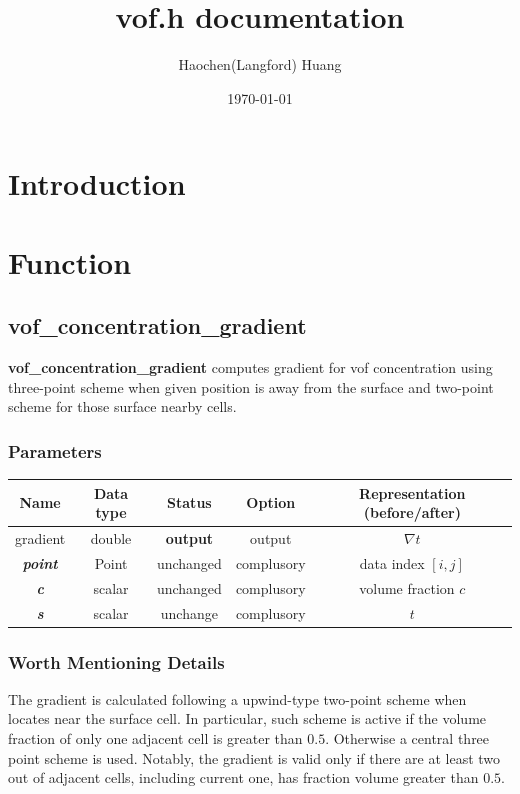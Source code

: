 \documentclass[a4paper]{article}
\title{vof.h documentation}
\author{Haochen(Langford) Huang}
\date{\today}
\newcommand{\func}[1]{\textbf{\textcolor{function}{#1}}}
\newcommand{\para}[1]{\textbf{\emph{\textcolor{para}{#1}}}}
\begin{document}
\maketitle
\section{Introduction}
\section{Function}
\subsection{\func{vof\_concentration\_gradient}}
\func{vof\_concentration\_gradient} computes gradient for vof concentration using three-point scheme when given position is away from the surface and two-point scheme for those surface nearby cells.
\subsubsection{Parameters}
\begin{table}[h]
  \centering
  \begin{tabular}{|c|c|c|c|c|}
    \hline
    Name & Data type & Status & Option & Representation (before/after)\\[0.5ex]
    \hline\hline
    \rowcolor{output} gradient & double & \textbf{output} & output & $\nabla t$\\
    \hline
    \para{point} & Point & unchanged & complusory & data index $[i,j]$\\
    \hline
    \para{c} & scalar & unchanged & complusory & volume fraction $c$\\
    \hline
    \para{s} & scalar & unchange & complusory & $t$\\
    \hline
  \end{tabular}
\end{table}
\subsubsection{Worth Mentioning Details}
The gradient is calculated following a upwind-type two-point scheme when locates near the surface cell. In particular, such scheme is active if the volume fraction of only one adjacent cell is greater than $0.5$. Otherwise a central three point scheme is used. Notably, the gradient is valid only if there are at least two out of adjacent cells, including current one, has fraction volume greater than $0.5$.
\end{document}
